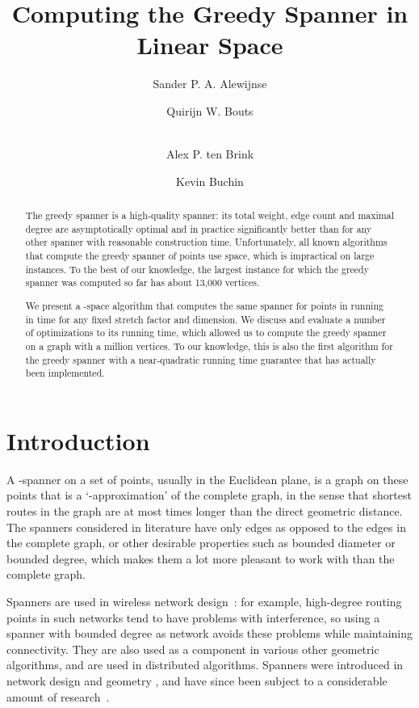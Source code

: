 \documentclass[runningheads,envcountsame,oribibl,orivec]{llncs}
\title{
 Computing the Greedy Spanner in Linear Space
}
\author{Sander P. A. Alewijnse \and
        Quirijn W. Bouts \and \\
        Alex P. ten Brink \and
        Kevin Buchin
}
\institute{
Eindhoven University of Technology, The Netherlands,
\path|{s.p.a.alewijnse,	q.w.bouts,a.p.t.brink}@student.tue.nl|,
\path|k.a.buchin@tue.nl|
}
\begin{document}
\mainmatter

\maketitle

\begin{abstract}
The greedy spanner is a high-quality spanner: its total weight, edge count and maximal degree are asymptotically optimal and in practice significantly better than for any other spanner with reasonable construction time. Unfortunately, all known algorithms that compute the greedy spanner of  points use  space, which is impractical on large instances. To the best of our knowledge, the largest instance for which the greedy spanner
was computed so far has about 13,000 vertices.

We present a -space algorithm that computes the same spanner for points in  running in  time for any fixed stretch factor and dimension. We discuss and evaluate a number of optimizations to its running time, which allowed us to compute the greedy spanner on a graph with a million vertices. To our knowledge, this is also the first algorithm for the greedy spanner with a near-quadratic running time guarantee that has actually been implemented.
\end{abstract}

\section{Introduction}

A -spanner on a set of points, usually in the Euclidean plane, is a graph on these points that is a `-approximation' of the complete graph, in the sense that shortest routes in the graph are at most  times longer than the direct geometric distance. The spanners considered in literature have only  edges as opposed to the  edges in the complete graph, or other desirable properties such as bounded diameter or bounded degree, which makes them a lot more pleasant to work with than the complete graph.

Spanners are used in wireless network design~\cite{GaoGHZZ05}: for example, high-degree routing points in such networks tend to have problems with interference, so using a spanner with bounded degree as network avoids these problems while maintaining connectivity. They are also used as a component in various other geometric algorithms, and are used in distributed algorithms. Spanners were introduced in network design \cite{JGT:JGT3190130114} and geometry \cite{Chew1989}, and have since been subject to a considerable amount of research~\cite{DilationandDetours,Narasimhan:2007:GSN:1208237}.
\end{document}
